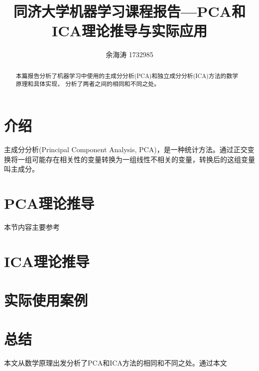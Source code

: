 \documentclass[UTF8,zihao=5]{ctexart}
\title{同济大学机器学习课程报告---PCA和ICA理论推导与实际应用}
\author{余海涛 1732985}
\begin{document}
\maketitle

\begin{abstract}
    本篇报告分析了机器学习中使用的主成分分析(PCA)和独立成分分析(ICA)方法的数学原理和具体实现，
    分析了两者之间的相同和不同之处。
\end{abstract}


\section{介绍}
主成分分析(Principal Component Analysis, PCA)，是一种统计方法。通过正交变换将一组可能存在相关性的变量转换为一组线性不相关的变量，转换后的这组变量叫主成分。

\section{PCA理论推导}
本节内容主要参考\cite{pca}
\section{ICA理论推导}

\section{实际使用案例}

\section{总结}
本文从数学原理出发分析了PCA和ICA方法的相同和不同之处。通过本文

% 

\end{document}
